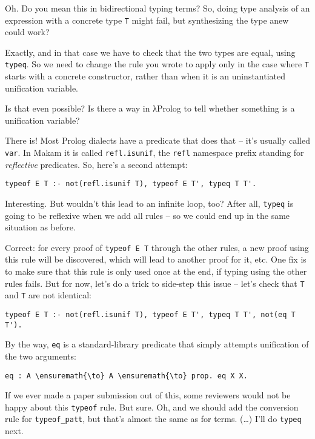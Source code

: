 \heroSTUDENT{} Oh. Do you mean this in bidirectional typing terms? So, doing
type analysis of an expression with a concrete type \texttt{T} might
fail, but synthesizing the type anew could work?

\heroADVISOR{} Exactly, and in that case we have to check that the two types
are equal, using \texttt{typeq}. So we need to change the rule you wrote
to apply only in the case where \texttt{T} starts with a concrete
constructor, rather than when it is an uninstantiated unification
variable.

\heroSTUDENT{} Is that even possible? Is there a way in \foreignlanguage{greek}{λ}Prolog to tell
whether something is a unification variable?

\heroADVISOR{} There is! Most Prolog dialects have a predicate that does that
-- it's usually called \texttt{var}. In Makam it is called
\texttt{refl.isunif}, the \texttt{refl} namespace prefix standing for
\emph{reflective} predicates. So, here's a second attempt:

\begin{verbatim}
typeof E T :- not(refl.isunif T), typeof E T', typeq T T'.
\end{verbatim}

\heroSTUDENT{} Interesting. But wouldn't this lead to an infinite loop, too?
After all, \texttt{typeq} is going to be reflexive when we add all rules
-- so we could end up in the same situation as before.

\heroADVISOR{} Correct: for every proof of
\texttt{typeof\ E\ T\textquotesingle{}} through the other rules, a new
proof using this rule will be discovered, which will lead to another
proof for it, etc. One fix is to make sure that this rule is only used
once at the end, if typing using the other rules fails. But for now,
let's do a trick to side-step this issue -- let's check that \texttt{T}
and \texttt{T\textquotesingle{}} are not identical:

\begin{verbatim}
typeof E T :- not(refl.isunif T), typeof E T', typeq T T', not(eq T T').
\end{verbatim}

By the way, \texttt{eq} is a standard-library predicate that simply
attempts unification of the two arguments:

\begin{verbatim}
eq : A \ensuremath{\to} A \ensuremath{\to} prop. eq X X.
\end{verbatim}

\heroSTUDENT{} If we ever made a paper submission out of this, some reviewers
would not be happy about this \texttt{typeof} rule. But sure. Oh, and we
should add the conversion rule for \texttt{typeof\_patt}, but that's
almost the same as for terms. (\ldots{}) I'll do \texttt{typeq} next.

